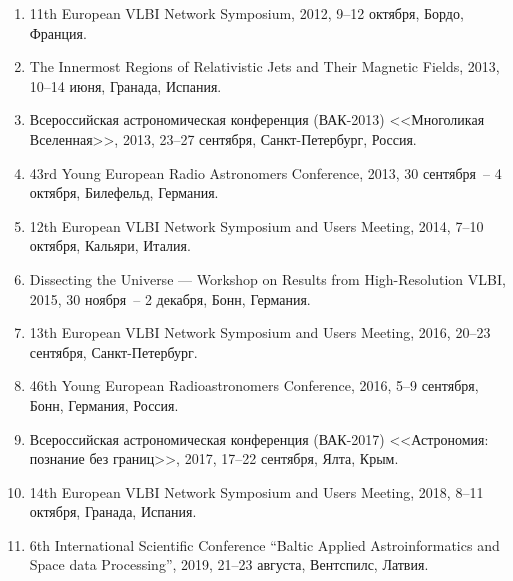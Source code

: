 \begin{enumerate}
 \item
 11th European VLBI Network Symposium,
2012, 9--12 октября, Бордо, Франция.

 \item
 The Innermost Regions of Relativistic Jets and Their Magnetic Fields,
 2013, 10--14 июня, Гранада, Испания.

 \item
 Всероссийская астрономическая конференция (ВАК-2013) <<Многоликая Вселенная>>,
2013, 23--27 сентября, Санкт-Петербург, Россия.

 \item
 43rd Young European Radio Astronomers Conference,
2013, 30 сентября~-- 4 октября, Билефельд, Германия.

 \item
 12th European VLBI Network Symposium and Users Meeting,
2014, 7--10 октября, Кальяри, Италия.

 \item
 Dissecting the Universe --- Workshop on Results from High-Resolution VLBI,
2015, 30 ноября~-- 2 декабря, Бонн, Германия.

 \item
 13th European VLBI Network Symposium and Users Meeting,
 2016, 20--23 сентября, Санкт-Петербург.

 \item
 46th Young European Radioastronomers Conference,
2016, 5--9 сентября, Бонн, Германия, Россия.

 \item
 Всероссийская астрономическая конференция (ВАК-2017) <<Астрономия: познание без границ>>,
 2017, 17--22 сентября, Ялта, Крым.

 \item
 14th European VLBI Network Symposium and Users Meeting,
 2018, 8--11 октября, Гранада, Испания.

 \item
 6th International Scientific Conference ``Baltic Applied Astroinformatics and Space data
Processing'', 2019, 21--23 августа, Вентспилс, Латвия.

\end{enumerate}


